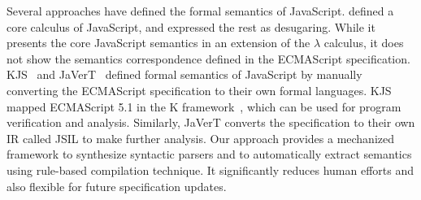 Several approaches have defined the formal semantics of JavaScript.
\citet{lambdajs} defined a core calculus of JavaScript, and expressed the
rest as desugaring.  While it presents the core JavaScript semantics in
an extension of the $\lambda$ calculus, it does not show the semantics
correspondence defined in the ECMAScript specification.  KJS~\cite{kjs} and
JaVerT~\cite{javert} defined formal semantics of JavaScript by manually converting
the ECMAScript specification to their own formal languages.  KJS mapped
ECMAScript 5.1 in the K framework~\cite{kframework}, which can be used
for program verification and analysis.  Similarly, JaVerT converts the
specification to their own IR called JSIL to make further analysis.
Our approach provides a mechanized framework to synthesize syntactic parsers and
to automatically extract semantics
using rule-based compilation technique. It significantly reduces human
efforts and also flexible for future specification updates.


